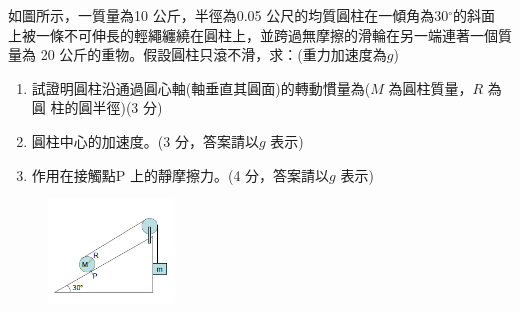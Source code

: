 \documentclass[cn,10pt,math=newtx,chinesefont=founder,device=ig]{elegantbook}
\begin{document}
\begin{example}
   如圖所示，一質量為10 公斤，半徑為0.05 公尺的均質圓柱在一傾角為30$^\circ$的斜面
上被一條不可伸長的輕繩纏繞在圓柱上，並跨過無摩擦的滑輪在另一端連著一個質量為
20 公斤的重物。假設圓柱只滾不滑，求：(重力加速度為$g$)

\begin{enumerate}[label=(\arabic*)] 
  \item 試證明圓柱沿通過圓心軸(軸垂直其圓面)的轉動慣量為($M$ 為圓柱質量，$R$ 為圓
柱的圓半徑)(3 分)
  \item 圓柱中心的加速度。(3 分，答案請以$g$ 表示)
  \item 作用在接觸點P 上的靜摩擦力。(4 分，答案請以$g$ 表示)
    \end{enumerate}
    \rightline{[台中女中教甄109]}
\end{example}
\begin{solution}
    
\end{solution}
\begin{figure}[htbp]
    \flushright
    \includegraphics[width=0.3\textwidth]{image/109中女22.png}
  \end{figure}
\newpage
\end{document}
